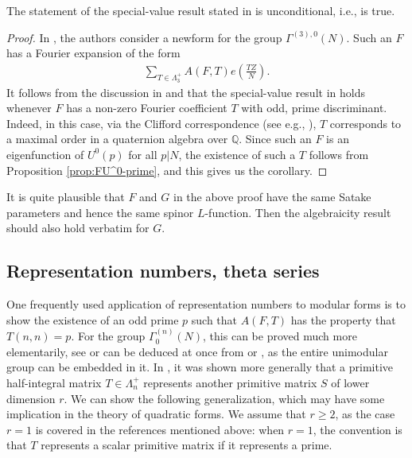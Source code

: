 \documentclass[11pt]{amsart}
\numberwithin{equation}{section}
\newcommand{\Q}{\mathbb{Q}}
\newcommand{\sumn}{\sum \nolimits}
\begin{document}
\begin{corollary} \label{spl-val}
    The statement of the special-value result stated in \cite[Theorem~1.1.2]{eischen2024algebraicity} is unconditional, i.e., \cite[Condition~1.1.1]{eischen2024algebraicity} is true.
\end{corollary}

\begin{proof}
    In \cite{eischen2024algebraicity}, the authors consider a newform for the group $\Gamma^{(3),0}(N)$. Such an $F$ has a Fourier expansion of the form
    \begin{align} \label{f-fe}
        \sumn_{T \in \Lambda_3^+} A(F,T) e(\frac{T Z}{N}).
    \end{align}
It follows from the discussion in \cite[Section~5.1]{boche-das} and \cite[Condition~1.1.1]{eischen2024algebraicity} that the special-value result in \cite{eischen2024algebraicity} holds whenever $F$ has a non-zero Fourier coefficient $T$ with odd, prime discriminant. Indeed, in this case, via the Clifford correspondence (see e.g., \cite[Proposition~3.3]{pollack2017spin}), $T$ corresponds to a maximal order in a quaternion algebra over $\Q$.
Since such an $F$ is an eigenfunction of $U^0(p)$ for all $p|N$, the existence of such a $T$ follows from Proposition \ref{prop:FU^0-prime}, and this gives us the corollary.
\end{proof}

\begin{remark}
    It is quite plausible that $F$ and $G$ in the above proof have the same Satake parameters and hence the same spinor $L$-function. Then the algebraicity result should also hold verbatim for $G$.
\end{remark}

\subsection{Representation numbers, theta series}

One frequently used application of representation numbers to modular forms is to show the existence of an odd prime $p$ such that $A(F,T)$ has the property that $T(n,n)=p$.
For the group $\Gamma^{(n)}_0(N)$, this can be proved much more elementarily, see \cite{martin2025prime} or can be deduced at once from \cite{pleasants1966representation} or \cite{iwaniec1974primes}, as the entire unimodular group can be embedded in it.  In \cite{martin2025prime}, it was shown more generally that a primitive half-integral matrix $T \in \Lambda_n^+$ represents another primitive matrix $S$ of lower dimension $r$. We can show the following generalization, which may have some implication in the theory of quadratic forms. We assume that $r \ge 2$, as the case $r=1$ is covered in the references mentioned above: when $r=1$, the convention is that $T$ represents a scalar primitive matrix if it represents a prime.
\end{document}
